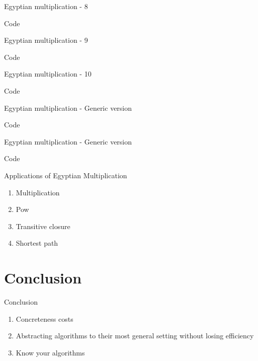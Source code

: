 \documentclass[10pt]{beamer}
\begin{document}
\begin{frame}[fragile]{Egyptian multiplication - 8}
\begin{block}{Code}\end{block}
\end{frame}

\begin{frame}[fragile]{Egyptian multiplication - 9}
\begin{block}{Code}\end{block}
\end{frame}

\begin{frame}[fragile]{Egyptian multiplication - 10}
\begin{block}{Code}\end{block}
\end{frame}

\begin{frame}[fragile]{Egyptian multiplication - Generic version}
\begin{block}{Code}\end{block}
\end{frame}

\begin{frame}[fragile]{Egyptian multiplication - Generic version}
\begin{block}{Code}\end{block}
\end{frame}

\begin{frame}[fragile]{Applications of Egyptian Multiplication}
\begin{block}
  \begin{enumerate}
    \item Multiplication
    \item Pow
    \item Transitive closure
    \item Shortest path
  \end{enumerate}
\end{block}
\end{frame}

\section{Conclusion}

\begin{frame}{Conclusion}
  \begin{enumerate}
    \item Concreteness costs
    \item Abstracting algorithms to their most general setting without losing efficiency
    \item Know your algorithms
  \end{enumerate}
\end{frame}
\end{document}
